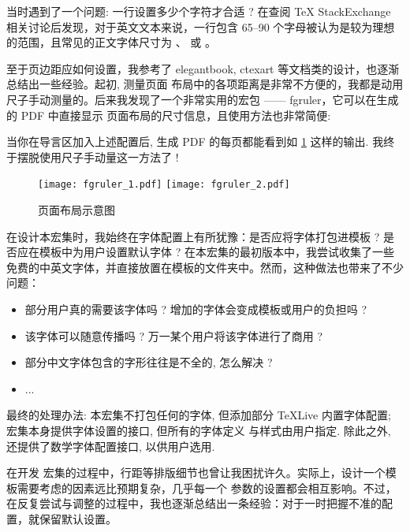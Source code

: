 \documentclass[
  hyper, lang=cn,
  mathSpec={envStyle=leftbar},
]{../../zlatex/code/ztex}
\let\cmd\ztexverb
\newcommand{\pkg}[1]{\textsf{#1}}
\newcommand{\cls}[1]{\textsf{#1}}
\begin{document}
当时遇到了一个问题: 一行设置多少个字符才合适 ? 在查阅 \TeX{} StackExchange 相关讨论后发现，对于英文文本来说，一行包含 65–90 
个字母被认为是较为理想的范围，且常见的正文字体尺寸为 \cmd{10pt}、\cmd{11pt} 或 \cmd{12pt}。

至于页边距应如何设置，我参考了 \cls{elegantbook}, \cls{ctexart} 等文档类的设计，也逐渐总结出一些经验。起初, 测量页面
布局中的各项距离是非常不方便的，我都是动用尺子手动测量的。后来我发现了一个非常实用的宏包 —— \pkg{fgruler}，它可以在生成的 PDF 中直接显示
页面布局的尺寸信息，且使用方法也非常简便:

\begin{texhigh}[]
\usepackage[hshift=0mm,vshift=0mm]{fgruler}
\end{texhigh}

\noindent 当你在导言区加入上述配置后, 生成 PDF 的每页都能看到如 \cref{fig:fgruler-example} 这样的输出. 
我终于摆脱使用尺子手动量这一方法了 !

\begin{figure}[!htb]
    \centering
    \texttt{[image: fgruler\_1.pdf]}
    \texttt{[image: fgruler\_2.pdf]}
    \caption{页面布局示意图}
    \label{fig:fgruler-example}
\end{figure}

在设计本宏集时，我始终在字体配置上有所犹豫：是否应将字体打包进模板 ? 是否应在模板中为用户设置默认字体 ?
在本宏集的最初版本中，我尝试收集了一些免费的中英文字体，并直接放置在模板的文件夹中。然而，这种做法也带来了不少问题：

\begin{itemize}
    \item 部分用户真的需要该字体吗 ? 增加的字体会变成模板或用户的负担吗 ?
    \item 该字体可以随意传播吗 ? 万一某个用户将该字体进行了商用 ?
    \item 部分中文字体包含的字形往往是不全的, 怎么解决 ? 
    \item ...
\end{itemize}

最终的处理办法: 本宏集不打包任何的字体, 但添加部分 \TeX{}Live 内置字体配置; 宏集本身提供字体设置的接口, 但所有的字体定义
与样式由用户指定. 除此之外, \ztex{} 还提供了数学字体配置接口, 以供用户选用.

在开发 \ztex{} 宏集的过程中，行距等排版细节也曾让我困扰许久。实际上，设计一个模板需要考虑的因素远比预期复杂，几乎每一个
参数的设置都会相互影响。不过，在反复尝试与调整的过程中，我也逐渐总结出一条经验：对于一时把握不准的配置，就保留默认设置。
\end{document}
